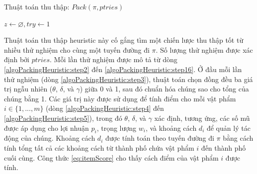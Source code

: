 \begin{algorithm}
\caption{Thuật toán thu thập: $Pack(\pi, ptries)$}
\label{algo:bgPack}
$z \leftarrow \varnothing , try \leftarrow 1$\;
\label{algoPackingHeuristic:step16}
\label{algoPackingHeuristic:step17}
\end{algorithm}

Thuật toán thu thập heuristic này  cố gắng tìm một chiến lược thu thập tốt từ nhiều thử nghiệm cho cùng một tuyến đường đi $\pi$. Số lượng thử nghiệm được xác định bởi $ptries$. Mỗi lần thử nghiệm được mô tả từ dòng \ref{algoPackingHeuristic:step2} đến \ref{algoPackingHeuristic:step16}. Ở đầu mỗi lần thử nghiệm (dòng \ref{algoPackingHeuristic:step3}), thuật toán chọn đồng đều ba giá trị ngẫu nhiên ($\theta$, $\delta$, và $\gamma$) giữa 0 và 1, sau đó chuẩn hóa chúng sao cho tổng của chúng bằng 1. Các giá trị này được sử dụng để tính điểm cho mỗi vật phẩm $i\in \{1,...,m\}$ (dòng \ref{algoPackingHeuristic:step4} đến \ref{algoPackingHeuristic:step5}), trong đó $\theta$, $\delta$, và $\gamma$ xác định, tương ứng, các số mũ được áp dụng cho lợi nhuận $p_i$, trọng lượng $w_i$, và khoảng cách $d_i$ để quản lý tác động của chúng. Khoảng cách $d_i$ được tính toán theo tuyến đường đi $\pi$ bằng cách tính tổng tất cả các khoảng cách từ thành phố chứa vật phẩm $i$ đến thành phố cuối cùng. Công thức \ref{eq:itemScore} cho thấy cách điểm của vật phẩm $i$ được tính.


